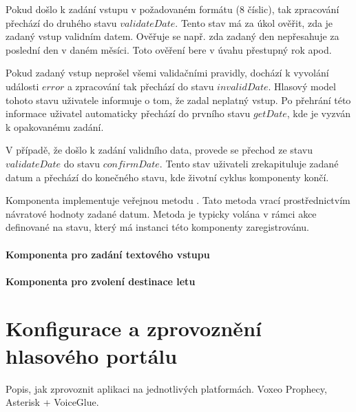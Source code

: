 \documentclass[ing,male,java,dept460]{diploma}						%
\begin{document}
Pokud došlo k zadání vstupu v požadovaném formátu (8 číslic), tak zpracování přechází do druhého stavu $validateDate$. Tento stav má za úkol ověřit, zda je zadaný vstup validním datem. Ověřuje se např. zda zadaný den nepřesahuje za poslední den v daném měsíci. Toto ověření bere v úvahu přestupný rok apod.

Pokud zadaný vstup neprošel všemi validačními pravidly, dochází k vyvolání události $error$ a zpracování tak přechází do stavu $invalidDate$. Hlasový model tohoto stavu uživatele informuje o tom, že zadal neplatný vstup. Po přehrání této informace uživatel automaticky přechází do prvního stavu $getDate$, kde je vyzván k opakovanému zadání.

V případě, že došlo k zadání validního data, provede se přechod ze stavu $validateDate$ do stavu $confirmDate$. Tento stav uživateli zrekapituluje zadané datum a přechází do konečného stavu, kde životní cyklus komponenty končí.

Komponenta implementuje veřejnou metodu . Tato metoda vrací prostřednictvím návratové hodnoty zadané datum. Metoda je typicky volána v rámci akce  definované na stavu, který má instanci této komponenty zaregistrovánu.


\paragraph{Komponenta pro zadání textového vstupu}


\paragraph{Komponenta pro zvolení destinace letu}



\section{Konfigurace a zprovoznění hlasového portálu}
Popis, jak zprovoznit aplikaci na jednotlivých platformách. Voxeo Prophecy, Asterisk + VoiceGlue.
\end{document}
